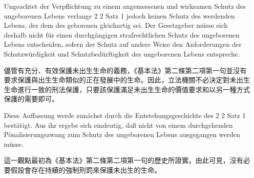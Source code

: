 \documentclass[12pt]{article}
\begin{document}
\syncleft
\begin{sourcepara}
Ungeachtet der Verpflichtung zu einem angemessenen und wirksamen Schutz des ungeborenen Lebens verlange \abbrArt{} 2 \abbrAbs{} 2 Satz 1 \abbrGG{}\ggfnArtTwoTwoOneDE{} jedoch keinen Schutz des werdenden Lebens, der dem des geborenen gleichartig sei. Der Gesetzgeber müsse sich deshalb nicht für einen durchgängigen strafrechtlichen Schutz des ungeborenen Lebens entscheiden, sofern der Schutz auf andere Weise den Anforderungen der Schutzwürdigkeit und Schutzbedürftigkeit des ungeborenen Lebens entspreche.
\end{sourcepara}
\begin{transpara}
儘管有充分、有效保護未出生生命的義務，《基本法》第二條第二項第一句\ggfnArtTwoTwoOneZH{}並沒有要求保護與出生生命類似的正在發展中的生命。因此，立法機關不必決定對未出生生命進行一致的刑法保護，只要該保護滿足未出生生命的價值要求和以另一種方式保護的需要即可。
\end{transpara}

\syncleft
\begin{sourcepara}
Diese Auffassung werde zunächst durch die Entstehungsgeschichte des \abbrArt{} 2 \abbrAbs{} 2 Satz 1 \abbrGG{}\ggfnArtTwoTwoOneDE{} bestätigt. Aus ihr ergebe sich eindeutig, daß nicht von einem durchgehenden Pönalisierungszwang zum Schutz des ungeborenen Lebens ausgegangen werden müsse.
\end{sourcepara}
\begin{transpara}
這一觀點最初為《基本法》第二條第二項第一句\ggfnArtTwoTwoOneZH{}的歷史所證實。由此可見，沒有必要假設會存在持續的強制刑罰來保護未出生的生命。
\end{transpara}
\end{document}
